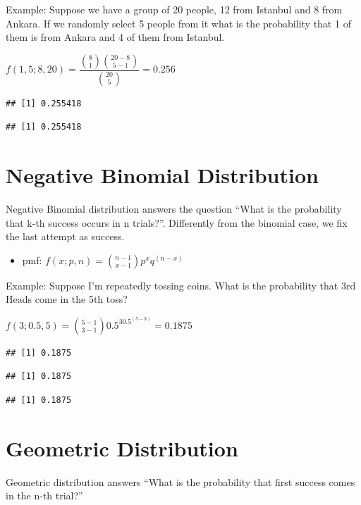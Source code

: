 \documentclass[]{book}
\providecommand{\tightlist}{%
  \setlength{\itemsep}{0pt}\setlength{\parskip}{0pt}}
\theoremstyle{definition}
\theoremstyle{definition}
\theoremstyle{definition}
\theoremstyle{remark}
\begin{document}
Example: Suppose we have a group of 20 people, 12 from Istanbul and 8
from Ankara. If we randomly select 5 people from it what is the
probability that 1 of them is from Ankara and 4 of them from Istanbul.

\(f(1,5;8,20) = \dfrac{\binom{8}{1}\binom{20-8}{5-1}}{\binom{20}{5}} = 0.256\)

\begin{verbatim}
## [1] 0.255418
\end{verbatim}

\begin{verbatim}
## [1] 0.255418
\end{verbatim}

\hypertarget{negative-binomial-distribution}{%
\section{Negative Binomial
Distribution}\label{negative-binomial-distribution}}

Negative Binomial distribution answers the question ``What is the
probability that k-th success occurs in n trials?''. Differently from
the binomial case, we fix the last attempt as success.

\begin{itemize}
\tightlist
\item
  pmf: \(f(x;p,n) = \binom{n-1}{x-1} p^xq^{(n-x)}\)
\end{itemize}

Example: Suppose I'm repeatedly tossing coins. What is the probability
that 3rd Heads come in the 5th toss?

\(f(3;0.5,5) = \binom{5-1}{3-1} 0.5^30.5^{(5-3)} = 0.1875\)

\begin{verbatim}
## [1] 0.1875
\end{verbatim}

\begin{verbatim}
## [1] 0.1875
\end{verbatim}

\begin{verbatim}
## [1] 0.1875
\end{verbatim}

\hypertarget{geometric-distribution}{%
\section{Geometric Distribution}\label{geometric-distribution}}

Geometric distribution answers ``What is the probability that first
success comes in the n-th trial?''
\end{document}
